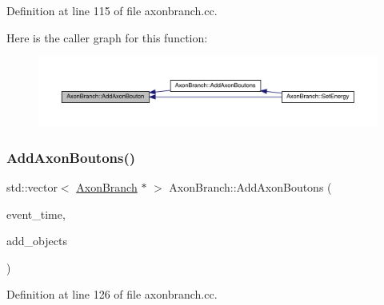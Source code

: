 Definition at line 115 of file axonbranch.\+cc.

Here is the caller graph for this function\+:\nopagebreak
\begin{figure}[H]
\begin{center}
\leavevmode
\includegraphics[width=350pt]{class_axon_branch_a88e6af84b45bb6f6f8900a6d4aec446c_icgraph}
\end{center}
\end{figure}
\mbox{\label{class_axon_branch_a788ca8cc7e6f60f07b9e19a8e3022b64}} 
\subsubsection{\texorpdfstring{Add\+Axon\+Boutons()}{AddAxonBoutons()}}
{\footnotesize\ttfamily std\+::vector$<$ \hyperlink{class_axon_branch}{Axon\+Branch} $\ast$ $>$ Axon\+Branch\+::\+Add\+Axon\+Boutons (\begin{DoxyParamCaption}\item[{std\+::chrono\+::time\+\_\+point$<$ \hyperlink{universe_8h_a0ef8d951d1ca5ab3cfaf7ab4c7a6fd80}{Clock} $>$}]{event\+\_\+time,  }\item[{std\+::vector$<$ \hyperlink{class_axon_branch}{Axon\+Branch} $\ast$$>$}]{add\+\_\+objects }\end{DoxyParamCaption})}



Definition at line 126 of file axonbranch.\+cc.

